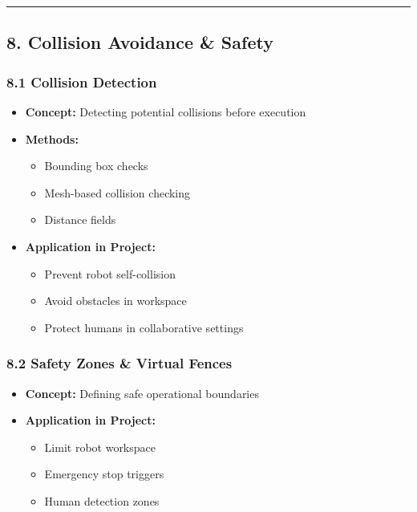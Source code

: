 \documentclass[
]{article}
\providecommand{\tightlist}{%
  \setlength{\itemsep}{0pt}\setlength{\parskip}{0pt}}
\begin{document}
\begin{center}\rule{0.5\linewidth}{0.5pt}\end{center}

\hypertarget{collision-avoidance-safety}{%
\subsection{8. Collision Avoidance \&
Safety}\label{collision-avoidance-safety}}

\hypertarget{collision-detection}{%
\subsubsection{8.1 Collision Detection}\label{collision-detection}}

\begin{itemize}
\tightlist
\item
  \textbf{Concept:} Detecting potential collisions before execution
\item
  \textbf{Methods:}

  \begin{itemize}
  \tightlist
  \item
    Bounding box checks
  \item
    Mesh-based collision checking
  \item
    Distance fields
  \end{itemize}
\item
  \textbf{Application in Project:}

  \begin{itemize}
  \tightlist
  \item
    Prevent robot self-collision
  \item
    Avoid obstacles in workspace
  \item
    Protect humans in collaborative settings
  \end{itemize}
\end{itemize}

\hypertarget{safety-zones-virtual-fences}{%
\subsubsection{8.2 Safety Zones \& Virtual
Fences}\label{safety-zones-virtual-fences}}

\begin{itemize}
\tightlist
\item
  \textbf{Concept:} Defining safe operational boundaries
\item
  \textbf{Application in Project:}

  \begin{itemize}
  \tightlist
  \item
    Limit robot workspace
  \item
    Emergency stop triggers
  \item
    Human detection zones
  \end{itemize}
\end{itemize}
\end{document}
